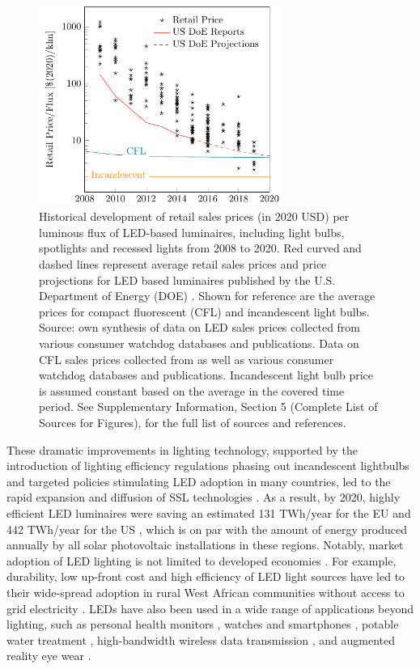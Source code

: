 \documentclass[twoside,twocolumn,9pt]{article}
\begin{document}
\begin{figure}
\centering
  \includegraphics[height=6.5cm]{2_SSL_EES/article/figures/cost_lamp_small.pdf}
  \caption{Historical development of retail sales prices (in 2020 USD) per luminous flux of LED-based luminaires, including light bulbs, spotlights and recessed lights from 2008 to 2020. Red curved and dashed lines represent average retail sales prices and price projections for LED based luminaires published by the U.S. Department of Energy (DOE) \cite{council2013assessment}. Shown for reference are the average prices for compact fluorescent (CFL) and incandescent light bulbs. Source: own synthesis of data on LED sales prices collected from various consumer watchdog databases and publications. Data on CFL sales prices collected from \cite{eger2018origin} as well as various consumer watchdog databases and publications. Incandescent light bulb price is assumed constant based on the average in the covered time period. See Supplementary Information, Section 5 (Complete List of Sources for Figures), for the full list of sources and references.}
  \label{fgr:cost_lamp_small}
\end{figure}

These  dramatic improvements in lighting technology, supported by the introduction of lighting efficiency regulations phasing out incandescent lightbulbs and targeted policies stimulating LED adoption in many countries, led to the rapid expansion and diffusion of SSL technologies  \cite{weinold2020long}\cite{Mills2014}\cite{Stegmaier2021}\cite{grubb2021new}. As a result, by 2020, highly efficient LED luminaires were saving an estimated 131 TWh/year for the EU \cite{eu2019impactass} and 442 TWh/year for the US \cite{guidehouse2020adoption}, which is on par with the amount of energy produced annually by all solar photovoltaic installations in these regions. Notably, market adoption of LED lighting is not limited to developed economies \cite{Kamat2020}. For example, durability, low up-front cost and high efficiency of LED light sources have led to their wide-spread adoption in rural West African communities without access to grid electricity \cite{Bensch2017}. LEDs have also been used in a wide range of applications beyond lighting, such as personal health monitors \cite{o2019optical}\cite{Wyatt2020}, watches and smartphones \cite{Bai2017}, potable water treatment \cite{Lui2014}, high-bandwidth wireless data transmission \cite{Haas2016}, and augmented reality eye wear \cite{Lee2016}. 
\end{document}
